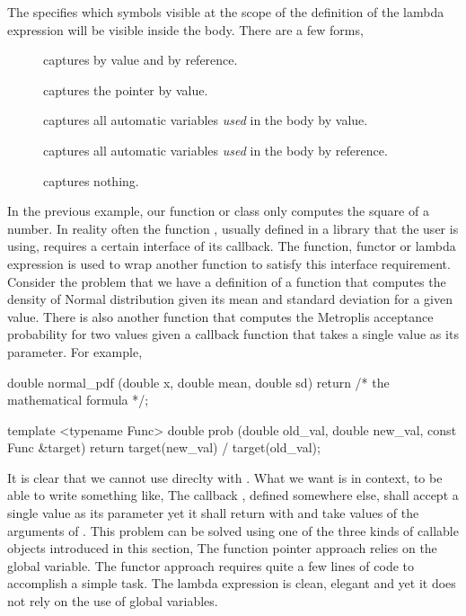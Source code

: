 The  specifies which symbols visible at the scope of
the definition of the lambda expression will be visible inside the body. There
are a few forms,
\begin{description}
  \item[\cppinline{[a, &b]}] captures  by value and 
    by reference.
  \item[\cppinline{[this]}] captures the  pointer by value.
  \item[\cppinline{[=]}] captures all automatic variables \emph{used} in the
    body by value.
  \item[\cppinline{[&]}] captures all automatic variables \emph{used} in the
    body by reference.
  \item[\cppinline{[]}] captures nothing.
\end{description}

In the previous example, our function  or class 
only computes the square of a number. In reality often the function
, usually defined in a library that the user is using, requires a
certain interface of its callback. The function, functor or lambda expression
is used to wrap another function to satisfy this interface requirement.
Consider the problem that we have a definition of a function that computes the
density of Normal distribution given its mean and standard deviation for a
given value. There is also another function that computes the Metroplis
acceptance probability for two values given a callback function that takes a
single value as its parameter. For example,
\begin{cppcode}
double normal_pdf (double x, double mean, double sd)
{ return /* the mathematical formula */; }

template <typename Func>
double prob (double old_val, double new_val, const Func &target)
{
    return target(new_val) / target(old_val);
}
\end{cppcode}
It is clear that we cannot use  direclty with
. What we want is in context, to be able to write something
like,
The callback , defined somewhere else, shall accept a single
value as its parameter yet it shall return 
with  and  take values of the arguments of
. This problem can be solved using one of the three
kinds of callable objects introduced in this section,
The function pointer approach relies on the global variable. The functor
approach requires quite a few lines of code to accomplish a simple task. The
lambda expression is clean, elegant and yet it does not rely on the use of
global variables.

